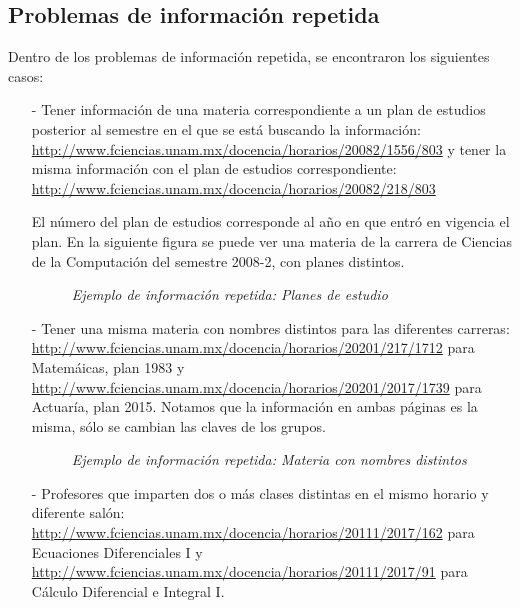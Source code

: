\subsection{Problemas de información repetida}

Dentro de los problemas de información repetida, se encontraron los siguientes casos:

\begin{itemize}
\item[-] Tener información de una materia correspondiente a un plan de estudios posterior al semestre en el que se está buscando la información: \url{http://www.fciencias.unam.mx/docencia/horarios/20082/1556/803} y tener la misma información con el plan de estudios correspondiente: \url{http://www.fciencias.unam.mx/docencia/horarios/20082/218/803}

El número del plan de estudios corresponde al año en que entró en vigencia el plan. En la siguiente figura se puede ver una materia de la carrera de Ciencias de la Computación del semestre 2008-2, con planes distintos.


\begin{figure}[H]
	\centering
	\caption{\textit{Ejemplo de información repetida: Planes de estudio}}
\end{figure}

\item[-] Tener una misma materia con nombres distintos para las diferentes carreras: \url{http://www.fciencias.unam.mx/docencia/horarios/20201/217/1712} para Matemáicas, plan 1983 y \url{http://www.fciencias.unam.mx/docencia/horarios/20201/2017/1739} para Actuaría, plan 2015. Notamos que la información en ambas páginas es la misma, sólo se cambian las claves de los grupos.

\begin{figure}[H]
	\centering
	\caption{\textit{Ejemplo de información repetida: Materia con nombres distintos}}
\end{figure}


\item[-] Profesores que imparten dos o más clases distintas en el mismo horario y diferente salón: \url{http://www.fciencias.unam.mx/docencia/horarios/20111/2017/162} para Ecuaciones Diferenciales I y \url{http://www.fciencias.unam.mx/docencia/horarios/20111/2017/91} para Cálculo Diferencial e Integral I.
  

\end{itemize}
